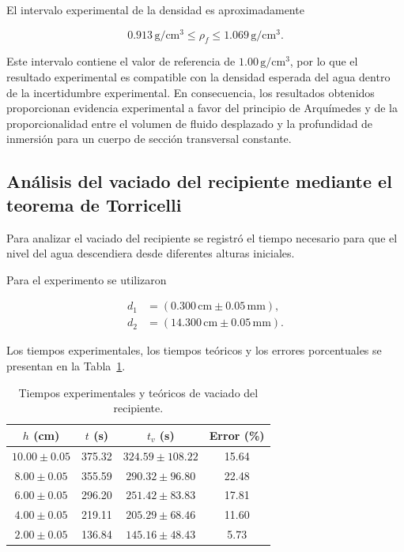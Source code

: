 El intervalo experimental de la densidad es aproximadamente

\begin{equation}
0.913\,\mathrm{g/cm^3}
\leq
\rho_f
\leq
1.069\,\mathrm{g/cm^3}.
\end{equation}

Este intervalo contiene el valor de referencia de $1.00\,\mathrm{g/cm^3}$, 
por lo que el resultado experimental es compatible con la densidad esperada del agua dentro de la incertidumbre experimental. 
En consecuencia, los resultados obtenidos proporcionan evidencia experimental a favor del principio de Arquímedes y de la proporcionalidad entre el volumen de fluido desplazado y la profundidad de inmersión para un cuerpo de sección transversal constante.

\subsection{Análisis del vaciado del recipiente mediante el teorema de Torricelli}

Para analizar el vaciado del recipiente se registró el tiempo necesario para que el nivel del agua descendiera desde diferentes alturas iniciales. 

Para el experimento se utilizaron

\begin{equation}
\begin{aligned}
d_1&=(0.300\,\mathrm{cm}\pm0.05\,\mathrm{mm}),\\
d_2&=(14.300\,\mathrm{cm}\pm0.05\,\mathrm{mm}).
\end{aligned}
\end{equation}

Los tiempos experimentales, los tiempos teóricos y los errores porcentuales se presentan en la Tabla~\ref{tab:torricelli}.

\begin{table}[htbp]
\centering
\caption{Tiempos experimentales y teóricos de vaciado del recipiente.}
\label{tab:torricelli}
\scriptsize
\begin{tabular}{cccc}
\hline
$h$ (cm) & $t$ (s) & $t_v$ (s) & Error (\%) \\
\hline
$10.00\pm0.05$ & 375.32 & $324.59\pm108.22$ & 15.64 \\
$8.00\pm0.05$ & 355.59 & $290.32\pm96.80$ & 22.48 \\
$6.00\pm0.05$ & 296.20 & $251.42\pm83.83$ & 17.81 \\
$4.00\pm0.05$ & 219.11 & $205.29\pm68.46$ & 11.60 \\
$2.00\pm0.05$ & 136.84 & $145.16\pm48.43$ & 5.73 \\
\hline
\end{tabular}
\end{table}

